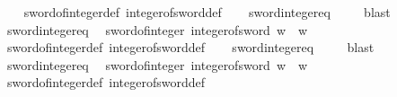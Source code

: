 \begin{isabellebody}
%
\isadelimproof
\ \ %
\endisadelimproof
%
\isatagproof
{}\isamarkupfalse%
\ sword{}{}{\isacharunderscore}{\kern0pt}of{\isacharunderscore}{\kern0pt}integer{\isacharunderscore}{\kern0pt}def\ integer{\isacharunderscore}{\kern0pt}of{\isacharunderscore}{\kern0pt}sword{}{}{\isacharunderscore}{\kern0pt}def\isanewline
\ \ \isamarkupfalse%
\ sword{\isacharunderscore}{\kern0pt}integer{\isacharunderscore}{\kern0pt}eq\ \isanewline
\ \ \isamarkupfalse%
\ blast%
\endisatagproof
{\isafoldproof}%
%
\isadelimproof
\isanewline
%
\endisadelimproof
\isanewline
{}\isamarkupfalse%
\ sword{}{}{\isacharunderscore}{\kern0pt}integer{\isacharunderscore}{\kern0pt}eq{\isacharcolon}{\kern0pt}\isanewline
\ \ {\isachardoublequoteopen}sword{}{}{\isacharunderscore}{\kern0pt}of{\isacharunderscore}{\kern0pt}integer\ {\isacharparenleft}{\kern0pt}integer{\isacharunderscore}{\kern0pt}of{\isacharunderscore}{\kern0pt}sword{}{}\ w{\isacharparenright}{\kern0pt}\ {\isacharequal}{\kern0pt}\ w{\isachardoublequoteclose}\ \isanewline
%
\isadelimproof
\ \ %
\endisadelimproof
%
\isatagproof
{}\isamarkupfalse%
\ sword{}{}{\isacharunderscore}{\kern0pt}of{\isacharunderscore}{\kern0pt}integer{\isacharunderscore}{\kern0pt}def\ integer{\isacharunderscore}{\kern0pt}of{\isacharunderscore}{\kern0pt}sword{}{}{\isacharunderscore}{\kern0pt}def\isanewline
\ \ \isamarkupfalse%
\ sword{\isacharunderscore}{\kern0pt}integer{\isacharunderscore}{\kern0pt}eq\ \isanewline
\ \ \isamarkupfalse%
\ blast%
\endisatagproof
{\isafoldproof}%
%
\isadelimproof
\isanewline
%
\endisadelimproof
\isanewline
{}\isamarkupfalse%
\ sword{}{}{\isacharunderscore}{\kern0pt}integer{\isacharunderscore}{\kern0pt}eq{\isacharcolon}{\kern0pt}\isanewline
\ \ {\isachardoublequoteopen}sword{}{}{\isacharunderscore}{\kern0pt}of{\isacharunderscore}{\kern0pt}integer\ {\isacharparenleft}{\kern0pt}integer{\isacharunderscore}{\kern0pt}of{\isacharunderscore}{\kern0pt}sword{}{}\ w{\isacharparenright}{\kern0pt}\ {\isacharequal}{\kern0pt}\ w{\isachardoublequoteclose}\isanewline
%
\isadelimproof
\ \ %
\endisadelimproof
%
\isatagproof
{}\isamarkupfalse%
\ sword{}{}{\isacharunderscore}{\kern0pt}of{\isacharunderscore}{\kern0pt}integer{\isacharunderscore}{\kern0pt}def\ integer{\isacharunderscore}{\kern0pt}of{\isacharunderscore}{\kern0pt}sword{}{}{\isacharunderscore}{\kern0pt}def\isanewline

\end{isabellebody}
